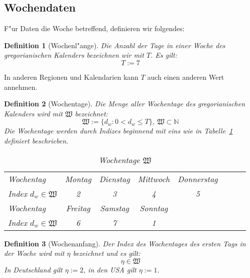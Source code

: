 \documentclass[a4paper]{article}
\newcommand*{\wkdays}{\mathfrak{W}}
\numberwithin{equation}{section}
\newtheorem{dfn}{Definition}
\begin{document}
%
%
\subsection{Wochendaten}
F"ur Daten die Woche betreffend, definieren wir folgendes:
\begin{dfn}[Wochenl"ange]
Die Anzahl der Tage in einer Woche des gregorianischen Kalenders bezeichnen wir
mit $T$. Es gilt:
\begin{equation}T := 7\end{equation}
\end{dfn}
\noindent In anderen Regionen und Kalendarien kann $T$ auch einen anderen Wert
annehmen.

\begin{dfn}[Wochentage]\label{def:weekdays}
  Die Menge aller Wochentage des gregorianischen Kalenders wird mit $\wkdays$
  bezeichnet:
  \begin{equation}
    \wkdays := \{ d_w : 0 < d_w \le T\},\ \wkdays \subset \mathbb{N}
  \end{equation}
  Die Wochentage werden durch Indizes beginnend mit eins
  wie in Tabelle~\ref{tab:weekDays} definiert beschrieben.
  \par
  \begin{table}[ht]
  \caption{Wochentage $\wkdays$}\label{tab:weekDays}
  \begin{tabularx}{\textwidth}{X|ccccccc}
    \hline
    Wochentag & Montag & Dienstag & Mittwoch & Donnerstag \\
    Index $d_w \in \wkdays$ & 2 & 3 & 4 & 5 \\
    \hline
    Wochentag & Freitag & Samstag & Sonntag & \\
    Index $d_w \in \wkdays$ & 6 & 7 & 1 & \\
    \hline
  \end{tabularx}\end{table}
\end{dfn}

\begin{dfn}[Wochenanfang]
  Der Index des Wochentages des ersten Tags in der Woche wird mit $\eta$
  bezeichnet und es gilt:
  \begin{equation}\eta \in \wkdays\end{equation}
  In Deutschland gilt $\eta := 2$, in den USA gilt $\eta := 1$.
\end{dfn}


%
%
\end{document}
